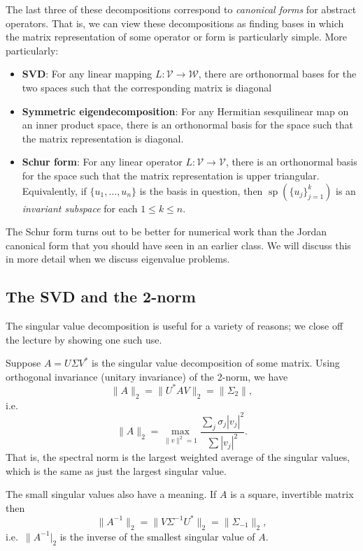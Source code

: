 \documentclass[12pt, leqno]{article}
\begin{document}
The last three of these decompositions correspond to
{\em canonical forms} for abstract operators.  That is, we can view
these decompositions as finding bases in which the matrix
representation of some operator or form is particularly simple.
More particularly:
\begin{itemize}
\item {\bf SVD}:
  For any linear mapping $L : \mathcal{V} \rightarrow \mathcal{W}$,
  there are orthonormal bases for the two spaces such that the
  corresponding matrix is diagonal
\item {\bf Symmetric eigendecomposition}:
  For any Hermitian sesquilinear map on an inner product space, there
  is an orthonormal basis for the space such that the matrix
  representation is diagonal.
\item {\bf Schur form}:
  For any linear operator $L : \mathcal{V} \rightarrow \mathcal{V}$,
  there is an orthonormal basis for the space such that the matrix
  representation is upper triangular.  Equivalently, if
  $\{u_1, \ldots, u_n\}$ is the basis in question,
  then $\operatorname{sp}(\{u_j\}_{j=1}^k)$ is an
  {\em invariant subspace} for each $1 \leq k \leq n$.
\end{itemize}
The Schur form turns out to be better for numerical work than the
Jordan canonical form that you should have seen in an earlier class.
We will discuss this in more detail when we discuss eigenvalue
problems.

\subsection{The SVD and the 2-norm}

The singular value decomposition is useful for a variety of reasons;
we close off the lecture by showing one such use.

Suppose $A = U \Sigma V^*$ is the singular value decomposition of some
matrix.  Using orthogonal invariance (unitary invariance) of the
2-norm, we have
\[
  \|A\|_2 = \|U^* A V\|_2 = \|\Sigma_2\|,
\]
i.e.~
\[
  \|A\|_2 = \max_{\|v\|^2 = 1} \frac{\sum_j \sigma_j |v_j|^2}{\sum |v_j|^2}.
\]
That is, the spectral norm is the largest weighted average of the
singular values, which is the same as just the largest singular value.

The small singular values also have a meaning.  If $A$ is a square,
invertible matrix then
\[
  \|A^{-1}\|_2 = \|V \Sigma^{-1} U^*\|_2 = \|\Sigma_{-1}\|_2,
\]
i.e.~$\|A^{-1}|_2$ is the inverse of the smallest singular value of $A$.
\end{document}
